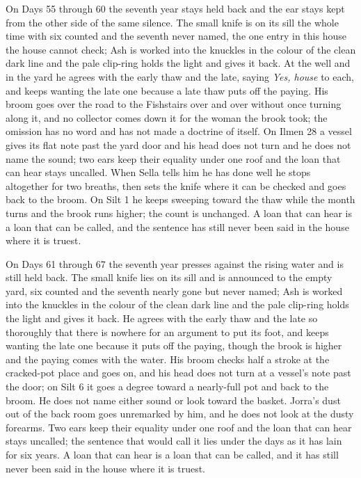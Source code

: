 \documentclass{design/chronicle}
\begin{document}
{On Days 55 through 60 the seventh year stays held back and the ear stays kept from the other side of the same silence. The small knife is on its sill the whole time with six counted and the seventh never named, the one entry in this house the house cannot check; Ash is worked into the knuckles in the colour of the clean dark line and the pale clip-ring holds the light and gives it back. At the well and in the yard he agrees with the early thaw and the late, saying \emph{Yes, house} to each, and keeps wanting the late one because a late thaw puts off the paying. His broom goes over the road to the Fishstairs over and over without once turning along it, and no collector comes down it for the woman the brook took; the omission has no word and has not made a doctrine of itself. On Ilmen 28 a vessel gives its flat note past the yard door and his head does not turn and he does not name the sound; two ears keep their equality under one roof and the loan that can hear stays uncalled. When Sella tells him he has done well he stops altogether for two breaths, then sets the knife where it can be checked and goes back to the broom. On Silt 1 he keeps sweeping toward the thaw while the month turns and the brook runs higher; the count is unchanged. A loan that can hear is a loan that can be called, and the sentence has still never been said in the house where it is truest.

On Days 61 through 67 the seventh year presses against the rising water and is still held back. The small knife lies on its sill and is announced to the empty yard, six counted and the seventh nearly gone but never named; Ash is worked into the knuckles in the colour of the clean dark line and the pale clip-ring holds the light and gives it back. He agrees with the early thaw and the late so thoroughly that there is nowhere for an argument to put its foot, and keeps wanting the late one because it puts off the paying, though the brook is higher and the paying comes with the water. His broom checks half a stroke at the cracked-pot place and goes on, and his head does not turn at a vessel’s note past the door; on Silt 6 it goes a degree toward a nearly-full pot and back to the broom. He does not name either sound or look toward the basket. Jorra’s dust out of the back room goes unremarked by him, and he does not look at the dusty forearms. Two ears keep their equality under one roof and the loan that can hear stays uncalled; the sentence that would call it lies under the days as it has lain for six years. A loan that can hear is a loan that can be called, and it has still never been said in the house where it is truest.

}
\end{document}
